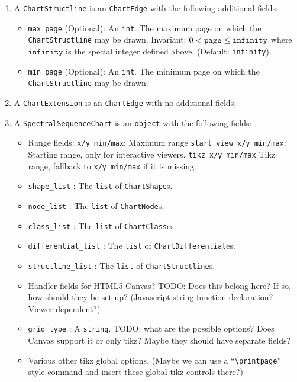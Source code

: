 \documentclass{article}
\begin{document}
\begin{enumerate}
\item A \texttt{ChartStructline} is an \texttt{ChartEdge} with the following additional fields:
    \begin{itemize}
    \item \verb|max_page| (Optional): An \texttt{int}. The maximum page on which the \texttt{ChartStructline} may be drawn.
        Invariant: $0<\verb|page|\leq \texttt{infinity}$ where $\texttt{infinity}$ is the special integer defined above. (Default: \texttt{infinity}).
    \item \verb|min_page| (Optional): An \texttt{int}. The minimum page on which the \texttt{ChartStructline} may be drawn.
    \end{itemize}

\item A \texttt{ChartExtension} is an \texttt{ChartEdge} with no additional fields.

\item A \texttt{SpectralSequenceChart} is an \texttt{object} with the following fields:
\begin{itemize}
\item Range fields:
    \texttt{x/y min/max}: Maximum range
    \verb|start_view_x/y min/max|: Starting range, only for interactive viewers.
    \verb|tikz_x/y min/max| Tikz range, fallback to \texttt{x/y min/max} if it is missing.

\item \verb|shape_list| : The \texttt{list} of \texttt{ChartShape}s.
\item \verb|node_list| : The \texttt{list} of \texttt{ChartNode}s.
\item \verb|class_list| : The \texttt{list} of \texttt{ChartClass}es.
\item \verb|differential_list| : The \texttt{list} of \texttt{ChartDifferential}es.
\item \verb|structline_list| : The \texttt{list} of \texttt{ChartStructline}s.
\item Handler fields for HTML5 Canvas? TODO: Does this belong here? If so, how should they be set up? (Javascript string function declaration? Viewer dependent?)
\item \verb|grid_type| : A \texttt{string}. TODO: what are the possible options? Does Canvas support it or only tikz? Maybe they should have separate fields?
\item Various other tikz global options. (Maybe we can use a ``\verb|\printpage|'' style command and insert these global tikz controls there?)
\end{itemize}
\end{enumerate}
\end{document}
